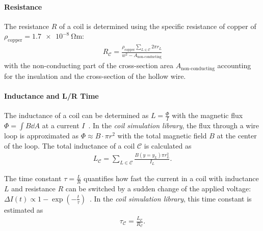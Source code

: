 \paragraph{Resistance}
The resistance $R$ of a coil is determined using the specific resistance of copper of $\rho_\text{copper} = \SI{1.7e-8}{\ohm\meter}$:
\begin{align}\label{eq:resistance_simulation}
    R_\mathcal{C} = \frac{\rho_\text{copper} \sum\limits_{L \in \mathcal{C}} 2\pi r_L} {w^2 - A_\text{non-conducting}}
\end{align}
with the non-conducting part of the cross-section area $A_\text{non-conducting}$ accounting for the insulation and the cross-section of the hollow wire.

\paragraph{Inductance and L/R Time}
The inductance of a coil can be determined as $L = \frac{\Phi}{I}$ with the magnetic flux $\Phi = \int B \dd A$ at a current $I$~\cite{demtroder_zeitlich_2013}. In the \textit{coil simulation library}, the flux through a wire loop is approximated as $\Phi \approx B \cdot \pi r^2$ with the total magnetic field $B$ at the center of the loop. The total inductance of a coil $\mathcal{C}$ is calculated as
\begin{align}\label{eq:inductance_simulation}
    L_\mathcal{C} = \sum\limits_{L \in \mathcal{C}} \frac{B(y = y_L) \pi r_L^2}{I_L}.
\end{align}

The time constant $\tau = \frac{L}{R}$ quantifies how fast the current in a coil with inductance $L$ and resistance $R$ can be switched by a sudden change of the applied voltage: $\Delta I(t) \propto 1-\exp \left(-\frac{t}{\tau}\right)$~\cite{demtroder_zeitlich_2013}. In the \textit{coil simulation library}, this time constant is estimated as
\begin{align}\label{eq:time_constant_simulation}
    \tau_\mathcal{C} = \frac{L_\mathcal{C}}{R_\mathcal{C}}.
\end{align}

